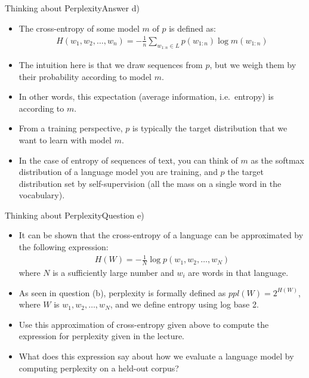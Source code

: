 \documentclass[t]{beamer}
\begin{document}
\begin{frame}{Thinking about Perplexity}{Answer d)}
    \begin{itemize}
        \item The cross-entropy of some model $m$ of $p$ is defined as:
              \begin{align*}
                  H(w_1,w_2,\ldots,w_n) = -\frac{1}{n}\sum_{w_{1:n}\in L} p(w_{1:n})\log m(w_{1:n})
              \end{align*}
        \item The intuition here is that we draw sequences from $p$, but we
              weigh them by their probability according to model $m$.
        \item In other words, this expectation (average information, i.e.\
              entropy) is according to $m$.
        \item From a training perspective, $p$ is typically the target
              distribution that we want to learn with model $m$.
        \item In the case of entropy of sequences of text, you can think of $m$
              as the softmax distribution of a language model you are training,
              and $p$ the target distribution set by self-supervision (all the
              mass on a single word in the vocabulary).
    \end{itemize}
\end{frame}

\begin{frame}{Thinking about Perplexity}{Question e)}
    \begin{itemize}
        \item It can be shown that the cross-entropy of a language can be
              approximated by the following expression:
              \begin{align}
                  H(W) = -\frac{1}{N} \log p(w_1,w_2,\ldots,w_N)
              \end{align}
              where $N$ is a sufficiently large number and $w_i$ are words in
              that language.
        \item As seen in question (b), perplexity is formally defined as
              $ppl(W) = 2^{H(W)}$, where $W$ is $w_1, w_2, \ldots, w_N$, and we
              define entropy using log base 2.
        \item Use this approximation of cross-entropy given above to compute the
              expression for perplexity given in the lecture.
        \item What does this expression say about how we evaluate a language
              model by computing perplexity on a held-out corpus?
    \end{itemize}
\end{frame}
\end{document}
